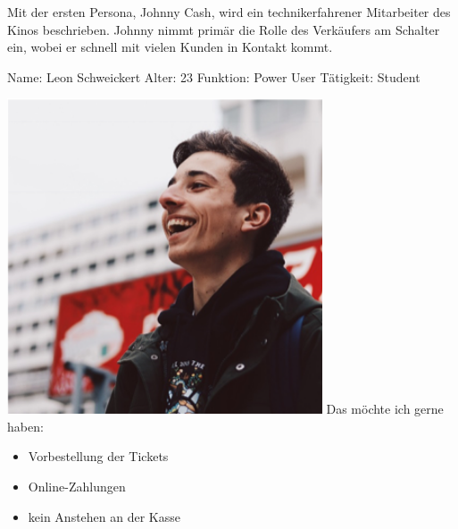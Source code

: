 Mit der ersten Persona, Johnny Cash, wird ein technikerfahrener Mitarbeiter des Kinos beschrieben. Johnny nimmt primär die Rolle des Verkäufers am Schalter ein, wobei er schnell mit vielen Kunden in Kontakt kommt. 

\newpage
{}
\begin{minipage}[t]{0.5\textwidth} 	\vspace{0.2\baselineskip} %
	\begin{entrylist}
		\entry
		{Name:}
		{Leon Schweickert}
		\entry
		{Alter:}
		{23}
		\entry
		{Funktion:}
		{Power User}
		\entry
		{Tätigkeit:}
		{Student}
	\end{entrylist}
	\begin{barchart}{5.0}\hspace{-1mm}
	\end{barchart}
\end{minipage}
\hfil
\begin{minipage}[t]{0.4\textwidth} 	\vspace{0.0\baselineskip} %
	\flushright
	\includegraphics[width=0.70\textwidth]{img/leon}
	\vspace{-0.2cm}
	\flushleft
	Das möchte ich gerne haben:
	\begin{itemize}
		\item Vorbestellung der Tickets
		\item Online-Zahlungen
		\item kein Anstehen an der Kasse
	\end{itemize}
\end{minipage}

